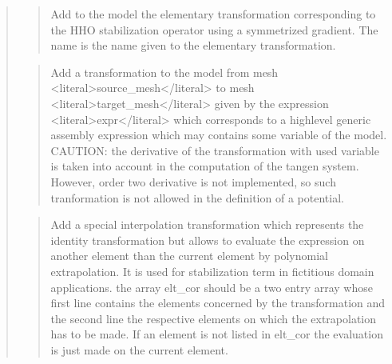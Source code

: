 \documentclass[a4paper,11pt,english]{sphinxmanual}
\begin{document}
\begin{quote}
\begin{quote}
\sphinxAtStartPar
Add to the model the elementary transformation corresponding to the
HHO stabilization operator using a symmetrized gradient.
The name is the name given to the elementary transformation.
\end{quote}

\sphinxAtStartPar
{}
\begin{quote}

\sphinxAtStartPar
Add a transformation to the model from mesh \textless{}literal\textgreater{}source\_mesh\textless{}/literal\textgreater{} to mesh
\textless{}literal\textgreater{}target\_mesh\textless{}/literal\textgreater{} given by the expression \textless{}literal\textgreater{}expr\textless{}/literal\textgreater{} which corresponds to a
high\sphinxhyphen{}level generic assembly expression which may contains some
variable of the model. CAUTION: the derivative of the
transformation with used variable is taken into account in the
computation of the tangen system. However, order two derivative is not
implemented, so such tranformation is not allowed in the definition
of a potential.
\end{quote}

\sphinxAtStartPar
{}
\begin{quote}

\sphinxAtStartPar
Add a special interpolation transformation which represents the identity
transformation but allows to evaluate the expression on another element
than the current element by polynomial extrapolation. It is used for
stabilization term in fictitious domain applications. the array elt\_cor
should be a two entry array whose first line contains the elements
concerned by the transformation and the second line the respective
elements on which the extrapolation has to be made. If an element
is not listed in elt\_cor the evaluation is just made on the current
element.
\end{quote}

\sphinxAtStartPar
{}
\begin{quote}


\end{quote}
\end{quote}
\end{document}
